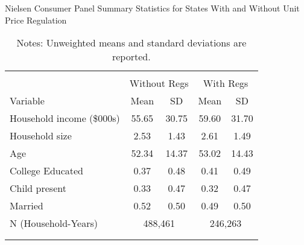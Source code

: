 \begin{table}[!htbp] \centering
\caption{Nielsen Consumer Panel Summary Statistics for States With and Without Unit Price Regulation}
\label{tab:summaryStatsUnitLaws}
\begin{tabular}{lcccc}
\\[-1.8ex]\hline
\hline \\[-1.8ex]
                          & \multicolumn{2}{c}{Without Regs} & \multicolumn{2}{c}{With Regs} \\
Variable                  & Mean  & SD    & Mean    & SD \\
\hline
Household income (\$000s) & 55.65 & 30.75 & 59.60   & 31.70  \\
Household size            & 2.53  & 1.43  & 2.61    & 1.49   \\
Age                       & 52.34 & 14.37 & 53.02   & 14.43  \\
College Educated          & 0.37  & 0.48  & 0.41    & 0.49   \\
Child present             & 0.33  & 0.47  & 0.32    & 0.47   \\
Married                   & 0.52  & 0.50  & 0.49    & 0.50 \\
N (Household-Years)       & \multicolumn{2}{c}{488,461} & \multicolumn{2}{c}{246,263}\\
\\[-1.8ex]\hline
\hline \\[-1.8ex]
\end{tabular}
\caption*{Notes: Unweighted means and standard deviations are reported.}
\end{table}

